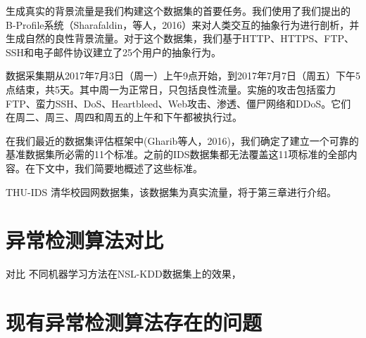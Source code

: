 生成真实的背景流量是我们构建这个数据集的首要任务。我们使用了我们提出的B-Profile系统（Sharafaldin，等人，2016）来对人类交互的抽象行为进行剖析，并生成自然的良性背景流量。对于这个数据集，我们基于HTTP、HTTPS、FTP、SSH和电子邮件协议建立了25个用户的抽象行为。

数据采集期从2017年7月3日（周一）上午9点开始，到2017年7月7日（周五）下午5点结束，共5天。其中周一为正常日，只包括良性流量。实施的攻击包括蛮力FTP、蛮力SSH、DoS、Heartbleed、Web攻击、渗透、僵尸网络和DDoS。它们在周二、周三、周四和周五的上午和下午都被执行过。

在我们最近的数据集评估框架中(Gharib等人，2016)，我们确定了建立一个可靠的基准数据集所必需的11个标准。之前的IDS数据集都无法覆盖这11项标准的全部内容。在下文中，我们简要地概述了这些标准。

THU-IDS 清华校园网数据集，该数据集为真实流量，将于第三章进行介绍。

\section{异常检测算法对比}
对比
不同机器学习方法在NSL-KDD数据集上的效果，
\section{现有异常检测算法存在的问题}